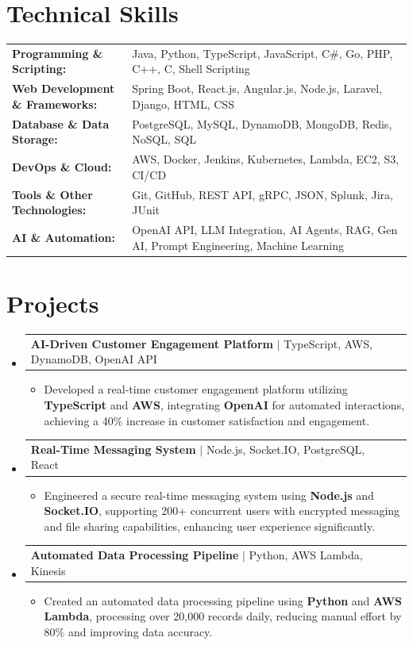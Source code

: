 \documentclass[letterpaper,10pt]{article}
\makeatletter
\newcommand{\resumeItem}[1]{
  \item{\fontsize{8pt}{9pt}\selectfont
    #1 \vspace{-3pt}
  }
}
\newcommand{\resumeProjectHeading}[2]{
    \item
    \begin{tabular*}{1.001\textwidth}{l@{\extracolsep{\fill}}r}
      \fontsize{8.5pt}{10pt}#1 & \textbf{\fontsize{8.5pt}{10pt} #2}\\
    \end{tabular*}\vspace{-7pt}
}
\newcommand{\resumeSubHeadingListStart}{\begin{itemize}[leftmargin=0pt, label={}]}
\newcommand{\resumeSubHeadingListEnd}{\end{itemize}}
\newcommand{\resumeItemListStart}{\begin{itemize}[leftmargin=*]}
\newcommand{\resumeItemListEnd}{\end{itemize}\vspace{-5pt}}
\makeatother
\begin{document}
\section{Technical Skills}
        \vspace{-14pt}
        \begin{table}[h]
            \fontsize{8pt}{9pt}\selectfont
            \begin{tabular}{p{0.3\linewidth} p{0.7\linewidth}}
                \textbf{Programming \& Scripting:} & Java, Python, TypeScript, JavaScript, C\#, Go, PHP, C++, C, Shell Scripting \\
                \textbf{Web Development \& Frameworks:} & Spring Boot, React.js, Angular.js, Node.js, Laravel, Django, HTML, CSS \\
                \textbf{Database \& Data Storage:} & PostgreSQL, MySQL, DynamoDB, MongoDB, Redis, NoSQL, SQL \\
                \textbf{DevOps \& Cloud:} & AWS, Docker, Jenkins, Kubernetes, Lambda, EC2, S3, CI/CD \\
                \textbf{Tools \& Other Technologies:} & Git, GitHub, REST API, gRPC, JSON, Splunk, Jira, JUnit \\
                \textbf{AI \& Automation:} & OpenAI API, LLM Integration, AI Agents, RAG, Gen AI, Prompt Engineering, Machine Learning \\
            \end{tabular}
        \end{table}
 \vspace{-18pt}

\section{Projects}
    \vspace{-5pt}
    \resumeSubHeadingListStart
          \resumeProjectHeading
            {\textbf{AI-Driven Customer Engagement Platform} $|$ TypeScript, AWS, DynamoDB, OpenAI API}{}
            \resumeItemListStart
                \resumeItem{Developed a real-time customer engagement platform utilizing \textbf{TypeScript} and \textbf{AWS}, integrating \textbf{OpenAI} for automated interactions, achieving a 40\% increase in customer satisfaction and engagement.}
            \resumeItemListEnd
        \vspace{-12pt}
    
        \resumeProjectHeading
            {\textbf{Real-Time Messaging System} $|$ Node.js, Socket.IO, PostgreSQL, React}{}
        \resumeItemListStart
                \resumeItem{Engineered a secure real-time messaging system using \textbf{Node.js} and \textbf{Socket.IO}, supporting 200+ concurrent users with encrypted messaging and file sharing capabilities, enhancing user experience significantly.}
        \resumeItemListEnd
      \vspace{-12pt}
      \resumeProjectHeading
        {\textbf{Automated Data Processing Pipeline} $|$ Python, AWS Lambda, Kinesis}{}
    \resumeItemListStart
            \resumeItem{Created an automated data processing pipeline using \textbf{Python} and \textbf{AWS Lambda}, processing over 20,000 records daily, reducing manual effort by 80\% and improving data accuracy.}
    \resumeItemListEnd
    \resumeSubHeadingListEnd
\end{document}

